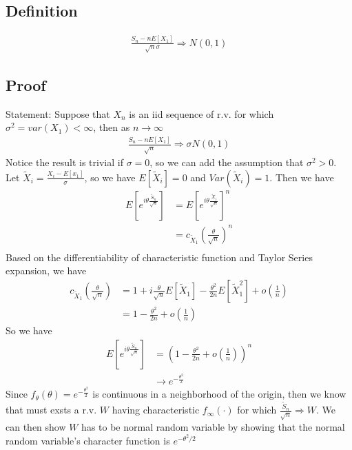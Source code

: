 \subsection{Definition}
    \begin{align*}
    \frac{S_n - n E[X_1]}{\sqrt{n}\sigma} \Rightarrow N(0,1)
    \end{align*}


\subsection{Proof}
Statement: Suppose that $X_n$ is an iid sequence of r.v. for which $\sigma^2 = var(X_1) < \infty$, then as $n \to \infty$ 
    \begin{align*}
        \frac{S_n - n E[X_1]}{\sqrt{n}} \Rightarrow \sigma N(0,1)
    \end{align*}
Notice the result is trivial if $\sigma = 0$, so we can add the assumption that $\sigma^2 > 0$. Let $\tilde{X}_i = \frac{X_i - E[x_1]}{\sigma}$, so we have $E[\tilde{X}_i]=0$ and $Var(\tilde{X}_i) = 1$. Then we have 
    \begin{align*}
        E[e^{i \theta \frac{\tilde{S}_n}{\sqrt{n}}}]
        & = E\left[  e^{i \theta \frac{\tilde{X}_i}{\sqrt{n}}} \right]^n\\
        & = c_{\tilde{X}_1}(\frac{\theta}{\sqrt{n}})^n \\
    \end{align*}
Based on the differentiability of characteristic function and Taylor Series expansion, we have 
    \begin{align*}
        c_{\tilde{X}_1}(\frac{\theta}{\sqrt{n}})
        & = 1 + i \frac{\theta}{\sqrt{n}} E[\tilde{X}_1] - \frac{\theta^2}{2n}E[\tilde{X}_1^2] + o(\frac{1}{n}) \\
        & = 1 - \frac{\theta^2}{2n} + o(\frac{1}{n})
    \end{align*}
So we have 
    \begin{align*}
        E[e^{i \theta \frac{\tilde{S}_n}{\sqrt{n}}}]
        & = (1 - \frac{\theta^2}{2n} + o(\frac{1}{n}))^n \\
        & \to e^{-\frac{\theta^2}{2}}
    \end{align*}
Since $f_\theta(\theta) = e^{-\frac{\theta^2}{2}}$ is continuous in a neighborhood of the origin, then we know that must exsts a r.v. $W$ having characteristic $f_\infty(\cdot)$ for which $\frac{\tilde{S}_n}{\sqrt{n}}\Rightarrow W$. We can then show $W$ has to be normal random variable by showing that the normal random variable's character function is $e^{-\theta^2/2}$

